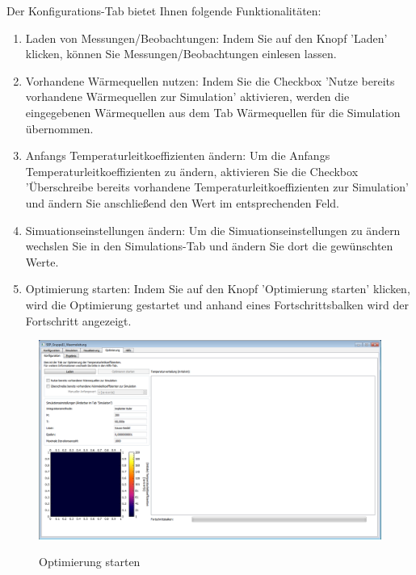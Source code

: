 Der Konfigurations-Tab bietet Ihnen folgende Funktionalitäten:\\
\begin{enumerate}
\item Laden von Messungen/Beobachtungen: Indem Sie auf den Knopf 'Laden' klicken, können Sie Messungen/Beobachtungen einlesen lassen.
\item Vorhandene Wärmequellen nutzen: Indem Sie die Checkbox 'Nutze bereits vorhandene Wärmequellen zur Simulation' aktivieren, werden die eingegebenen Wärmequellen aus dem Tab Wärmequellen für die Simulation übernommen.
\item Anfangs Temperaturleitkoeffizienten ändern: Um die Anfangs Temperaturleitkoeffizienten zu ändern, aktivieren Sie die Checkbox 'Überschreibe bereits vorhandene Temperaturleitkoeffizienten zur Simulation' und ändern Sie anschließend den Wert im entsprechenden Feld.
\item Simuationseinstellungen ändern: Um die Simuationseinstellungen zu ändern wechslen Sie in den Simulations-Tab und ändern Sie dort die gewünschten Werte.
\item Optimierung starten: Indem Sie auf den Knopf 'Optimierung starten' klicken, wird die Optimierung gestartet und anhand eines Fortschrittsbalken wird der Fortschritt angezeigt.
\end{enumerate}
\begin{figure}[H]
\centering
\includegraphics[scale=.25]{Benutzerdokumentation/OptimierungStarten.png}\\
\caption{Optimierung starten}
\label{OptimierungStarten}
\end{figure}

